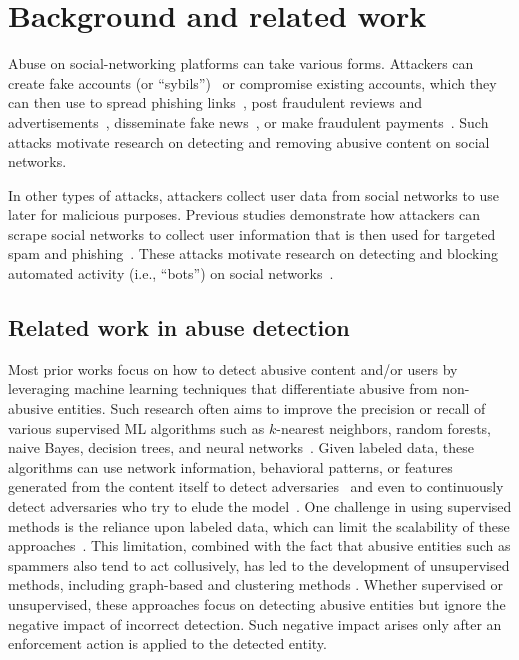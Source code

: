 \section{Background and related work}\label{sec:background}


Abuse on social-networking platforms can take various forms. Attackers can create fake accounts (or ``sybils'')~\cite{xiao2015detecting,gong2014sybilbelief,danezis2009sybilinfer,clickstream,uncovering_social} or compromise existing accounts, which they can then use to spread phishing links~\cite{gao2010detecting, grier2010spam}, post fraudulent reviews and advertisements~\cite{al2021spam}, disseminate fake news~\cite{elazab2018fraud}, or make fraudulent payments~\cite{caldeira2014fraud}. Such attacks motivate research on detecting and removing abusive content on social networks. 

In other types of attacks, attackers collect user data from social networks to use later for malicious purposes. Previous studies demonstrate how attackers can scrape social networks to collect user information that is then used for targeted spam and phishing~\cite{balduzzi2010abusing,jagatic2007social,brown2008social}. These attacks motivate research on detecting and blocking automated activity (i.e., ``bots'') on social networks~\cite{orabi2020detection}.

\subsection{Related work in abuse detection}
\label{sec:related_abuse}

Most prior works focus on how to detect abusive content and/or users by leveraging machine learning techniques that differentiate abusive from non-abusive entities. Such research often aims to improve the precision or recall of various supervised ML algorithms such as $k$-nearest neighbors, random forests, naive Bayes, decision trees, and neural networks~\cite{al2021spam,elazab2018fraud,caldeira2014fraud,acm2010,ceas2010,LCAI2011}. Given labeled data, these algorithms can use network information, behavioral patterns, or features generated from the content itself to detect adversaries~\cite{IEEE2016} and even to continuously detect adversaries who try to elude the model~\cite{KDD2004}. One challenge in using supervised methods is the reliance upon labeled data, which can limit the scalability of these approaches~\cite{IEEE2016}. This limitation, combined with the fact that abusive entities such as spammers also tend to act collusively, has led to the development of unsupervised methods, including graph-based and clustering methods \cite{WWW2013,ACM2014,WWW2016,IEEE2016}. Whether supervised or unsupervised, these approaches focus on detecting abusive entities but ignore the negative impact of incorrect detection. Such negative impact arises only after an enforcement action is applied to the detected entity.


